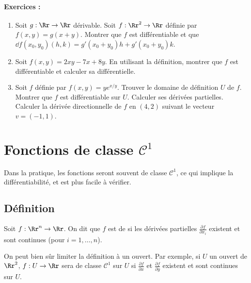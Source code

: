 \paragraph{Exercices :}
	\begin{enumerate}
		\item Soit $g : \Rr \to \Rr$ dérivable. Soit $f : \Rr^2 \to \Rr$ définie par $f(x,y)= g(x+y)$. Montrer que $f$ est différentiable et que
		$\dd f (x_0,y_0)(h,k) = g'(x_0+y_0)h + g'(x_0+y_0)k$.
		
		\item Soit $f(x,y) = 2xy-7x+8y$. En utilisant la définition, montrer que $f$ est différentiable et calculer sa différentielle.
		
		\item Soit $f$ définie par $f(x,y) = ye^{x/y}$. Trouver le domaine de définition $U$ de $f$. Montrer que $f$ est différentiable sur $U$. Calculer ses dérivées partielles. Calculer la dérivée directionnelle de $f$ en $(4,2)$ suivant le vecteur $v = (-1,1)$.
		
	\end{enumerate}






\section{Fonctions de classe $\mathcal{C}^1$}

Dans la pratique, les fonctions seront souvent de classe $\mathcal{C}^1$, ce qui implique la différentiabilité, et est plus facile à vérifier. 


\subsection{Définition}

\begin{definition}{}{}
	Soit $f: \Rr^n \to \Rr$. On dit que $f$ est de  si les dérivées partielles $\frac{\partial f}{\partial x_i}$
	existent et sont continues (pour $i=1,\ldots,n$).
\end{definition}

On peut bien sûr limiter la définition à un ouvert. Par exemple, si $U$ un ouvert de $\Rr^2$, $f : U \to \Rr$ sera de classe $\mathcal{C}^1$ sur $U$ si $\frac{\partial f}{\partial x}$ et $\frac{\partial f}{\partial y}$ existent et sont continues sur $U$.


